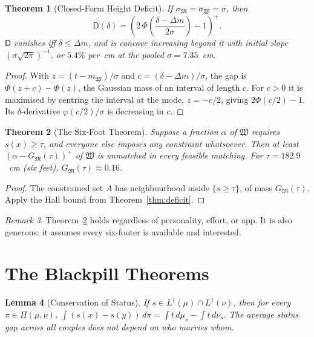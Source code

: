 \documentclass[11pt]{article}
\let\oldsection\section
\renewcommand{\section}{\Needspace{0.25\textheight}\oldsection}
\newtheorem{theorem}{Theorem}[section]
\newtheorem{lemma}[theorem]{Lemma}
\theoremstyle{definition}
\theoremstyle{remark}
\newtheorem{remark}[theorem]{Remark}
\newcommand{\M}{\mathfrak{M}}
\newcommand{\W}{\mathfrak{W}}
\newcommand{\D}{\mathsf{D}}
\begin{document}
\begin{theorem}[Closed-Form Height Deficit]
  If $\sigma_\M = \sigma_\W = \sigma$, then
  \begin{equation}
    \D(\delta) = \left(2\,\Phi\!\left(\frac{\delta-\Delta
    m}{2\sigma}\right) - 1\right)^{+}.
  \end{equation}
  $\D$ vanishes iff $\delta\le\Delta m$, and is concave increasing
  beyond it with initial slope $(\sigma\sqrt{2\pi})^{-1}$, or $5.4\%$
  per~\textup{cm} at the pooled $\sigma = 7.35$~\textup{cm}.
\end{theorem}

\begin{proof}
  With $z = (t-m_\W)/\sigma$ and $c = (\delta-\Delta m)/\sigma$, the
  gap is $\Phi(z+c) - \Phi(z)$, the Gaussian mass of an interval of
  length $c$. For $c > 0$ it is maximised by centring the interval
  at the mode, $z = -c/2$, giving $2\Phi(c/2) - 1$. Its
  $\delta$-derivative $\varphi(c/2)/\sigma$ is decreasing in $c$.
\end{proof}

\begin{theorem}[The Six-Foot Theorem]\label{thm:sixfoot}
  Suppose a fraction $\alpha$ of $\W$ requires $s(x)\ge\tau$, and
  everyone else imposes any constraint whatsoever. Then at least
  $(\alpha - G_\M(\tau))^+$ of $\W$ is unmatched in every feasible
  matching. For $\tau = 182.9$~\textup{cm} (six feet),
  $G_\M(\tau)\approx0.16$.
\end{theorem}

\begin{proof}
  The constrained set $A$ has neighbourhood inside $\{s\ge\tau\}$, of
  mass $G_\M(\tau)$. Apply the Hall bound from Theorem~\ref{thm:deficit}.
\end{proof}

\begin{remark}
  Theorem~\ref{thm:sixfoot} holds regardless of personality, effort,
  or app. It is also generous: it assumes every six-footer is
  available and interested.
\end{remark}

\section{The Blackpill Theorems}\label{sec:blackpill}

\begin{lemma}[Conservation of Status]\label{lem:status}
  If $s\in L^1(\mu)\cap L^1(\nu)$, then for every
  $\pi\in\Pi(\mu,\nu)$, $\int(s(x)-s(y))\,d\pi = \int t\,d\mu_s -
  \int t\,d\nu_s$. The average status gap across all couples does not
  depend on who marries whom.
\end{lemma}
\end{document}
